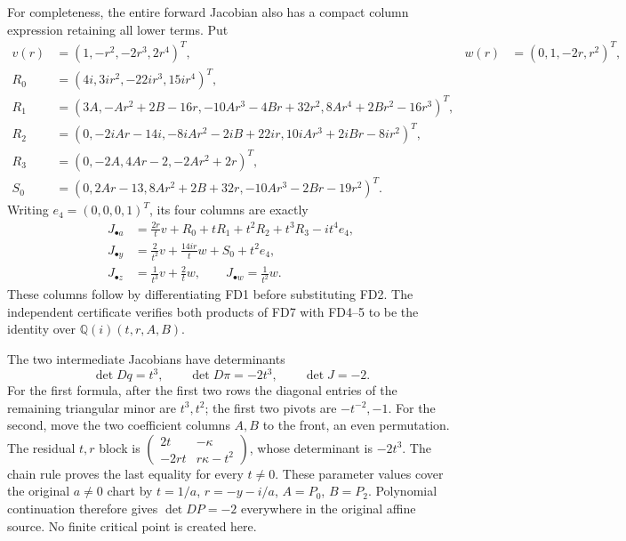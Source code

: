 \documentclass[11pt]{article}
\begin{document}
For completeness, the entire forward Jacobian also has a compact
column expression retaining all lower terms. Put
\[
\begin{aligned}
v(r)&=(1,-r^2,-2r^3,2r^4)^T,&
w(r)&=(0,1,-2r,r^2)^T,\\
R_0&=(4i,3ir^2,-22ir^3,15ir^4)^T,\\
R_1&=(3A,-Ar^2+2B-16r,
                  -10Ar^3-4Br+32r^2,8Ar^4+2Br^2-16r^3)^T,\\
R_2&=(0,-2iAr-14i,-8iAr^2-2iB+22ir,
                                10iAr^3+2iBr-8ir^2)^T,\\
R_3&=(0,-2A,4Ar-2,-2Ar^2+2r)^T,\\
S_0&=(0,2Ar-13,8Ar^2+2B+32r,
                              -10Ar^3-2Br-19r^2)^T.
\end{aligned}
\]
Writing \(e_4=(0,0,0,1)^T\), its four columns are exactly
\[
\begin{aligned}
J_{\bullet a}&=\frac{2r}{t}v+R_0+tR_1+t^2R_2+t^3R_3-it^4e_4,\\
J_{\bullet y}&=\frac2{t^2}v+\frac{14ir}{t}w+S_0+t^2e_4,\\
J_{\bullet z}&=\frac1{t^3}v+\frac2t w,\qquad
J_{\bullet w}=\frac1{t^2}w .
\end{aligned}\tag{FD7}
\]
These columns follow by differentiating FD1 before substituting
FD2. The independent certificate verifies both products of FD7
with FD4--5 to be the identity over
\(\mathbb Q(i)(t,r,A,B)\).

The two intermediate Jacobians have determinants
\[
 \det Dq=t^3,\qquad \det D\pi=-2t^3,\qquad \det J=-2.
 \tag{FD8}
\]
For the first formula, after the first two rows the diagonal
entries of the remaining triangular minor are \(t^3,t^2\);
the first two pivots are \(-t^{-2},-1\). For the second,
move the two coefficient columns \(A,B\) to the front, an
even permutation. The residual \(t,r\) block is
\(\left(\begin{smallmatrix}2t&-\kappa\\-2rt&r\kappa-t^2\end{smallmatrix}\right)\),
whose determinant is \(-2t^3\). The chain rule proves the
last equality for every \(t\ne0\). These parameter values
cover the original \(a\ne0\) chart by \(t=1/a\),
\(r=-y-i/a\), \(A=P_0\), \(B=P_2\). Polynomial continuation
therefore gives \(\det DP=-2\) everywhere in the original
affine source. No finite critical point is created here.
\end{document}
